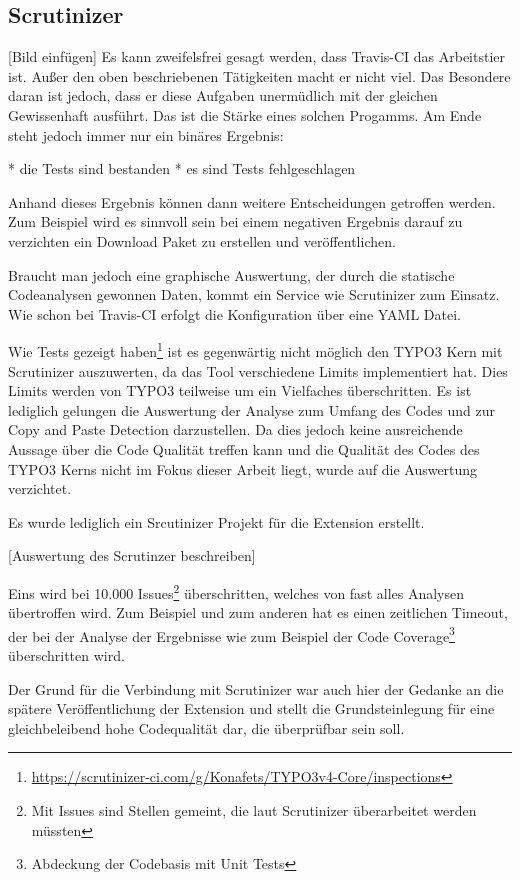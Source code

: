 \subsection{Scrutinizer}
[Bild einfügen]
Es kann zweifelsfrei gesagt werden, dass Travis-CI das Arbeitstier ist. Außer den oben beschriebenen Tätigkeiten macht er nicht viel. Das Besondere daran ist jedoch, dass er diese Aufgaben unermüdlich mit der gleichen Gewissenhaft ausführt. Das ist die Stärke eines solchen Progamms. Am Ende steht jedoch immer nur ein binäres Ergebnis:

* die Tests sind bestanden
* es sind Tests fehlgeschlagen

Anhand dieses Ergebnis können dann weitere Entscheidungen getroffen werden. Zum Beispiel wird es sinnvoll sein bei einem negativen Ergebnis darauf zu verzichten ein Download Paket zu erstellen und veröffentlichen.

Braucht man jedoch eine graphische Auswertung, der durch die statische Codeanalysen gewonnen Daten, kommt ein Service wie Scrutinizer zum Einsatz. Wie schon bei Travis-CI erfolgt die Konfiguration über eine YAML Datei.

Wie Tests gezeigt haben\footnote{\url{https://scrutinizer-ci.com/g/Konafets/TYPO3v4-Core/inspections}} ist es gegenwärtig nicht möglich den TYPO3 Kern mit Scrutinizer auszuwerten, da das Tool verschiedene Limits implementiert hat. Dies Limits werden von TYPO3 teilweise um ein Vielfaches überschritten. Es ist lediglich gelungen die Auswertung der Analyse zum Umfang des Codes und zur Copy and Paste Detection darzustellen. Da dies jedoch keine ausreichende Aussage über die Code Qualität treffen kann und die Qualität des Codes des TYPO3 Kerns nicht im Fokus dieser Arbeit liegt, wurde auf die Auswertung verzichtet.

Es wurde lediglich ein Srcutinizer Projekt für die Extension erstellt.

[Auswertung des Scrutinzer beschreiben]

Eins wird bei 10.000 Issues\footnote{Mit Issues sind Stellen gemeint, die laut Scrutinizer überarbeitet werden müssten} überschritten, welches von fast alles Analysen übertroffen wird. Zum Beispiel und zum anderen hat es einen zeitlichen Timeout, der bei der Analyse der Ergebnisse wie zum Beispiel der Code Coverage\footnote{Abdeckung der Codebasis mit Unit Tests} überschritten wird.

Der Grund für die Verbindung mit Scrutinizer war auch hier der Gedanke an die spätere Veröffentlichung der Extension und stellt die Grundsteinlegung für eine gleichbeleibend hohe Codequalität dar, die überprüfbar sein soll.

